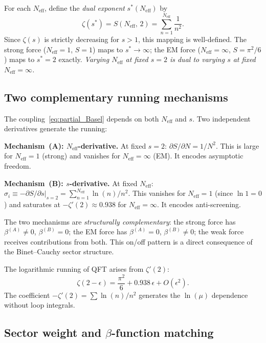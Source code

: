 \documentclass[12pt]{article}
\theoremstyle{remark}
\theoremstyle{definition}
\begin{document}
For each $N_\text{eff}$, define the \emph{dual exponent} $s^*(N_\text{eff})$ by
\begin{equation}
\zeta(s^*) = S(N_\text{eff},\, 2) = \sum_{n=1}^{N_\text{eff}} \frac{1}{n^2}.
\end{equation}
Since $\zeta(s)$ is strictly decreasing for $s > 1$, this mapping is well-defined.  The strong force ($N_\text{eff} = 1$, $S = 1$) maps to $s^* \to \infty$; the EM force ($N_\text{eff} = \infty$, $S = \pi^2/6$) maps to $s^* = 2$ exactly.  \emph{Varying $N_\text{eff}$ at fixed $s = 2$ is dual to varying $s$ at fixed $N_\text{eff} = \infty$.}

\subsection{Two complementary running mechanisms}
\label{sec:dual_mechanisms}

The coupling~\eqref{eq:partial_Basel} depends on both $N_\text{eff}$ and $s$.  Two independent derivatives generate the running:

\medskip\noindent\textbf{Mechanism~(A): $N_\text{eff}$-derivative.}
At fixed $s = 2$: $\partial S / \partial N = 1/N^2$.  This is large for $N_\text{eff} = 1$ (strong) and vanishes for $N_\text{eff} = \infty$ (EM).  It encodes asymptotic freedom.

\medskip\noindent\textbf{Mechanism~(B): $s$-derivative.}
At fixed $N_\text{eff}$: $\sigma_i \equiv -\partial S/\partial s |_{s=2} = \sum_{n=1}^{N_\text{eff}} \ln(n)/n^2$.  This vanishes for $N_\text{eff} = 1$ (since $\ln 1 = 0$) and saturates at $-\zeta'(2) \approx 0.938$ for $N_\text{eff} = \infty$.  It encodes anti-screening.

\medskip
The two mechanisms are \emph{structurally complementary}: the strong force has $\beta^{(A)} \neq 0$, $\beta^{(B)} = 0$; the EM force has $\beta^{(A)} = 0$, $\beta^{(B)} \neq 0$; the weak force receives contributions from both.  This on/off pattern is a direct consequence of the Binet--Cauchy sector structure.

The logarithmic running of QFT arises from $\zeta'(2)$:
\begin{equation}
\zeta(2 - \epsilon) = \frac{\pi^2}{6} + 0.938\,\epsilon + O(\epsilon^2).
\end{equation}
The coefficient $-\zeta'(2) = \sum \ln(n)/n^2$ generates the $\ln(\mu)$ dependence without loop integrals.

\subsection{Sector weight and $\beta$-function matching}
\label{sec:sector_weight}
\end{document}
